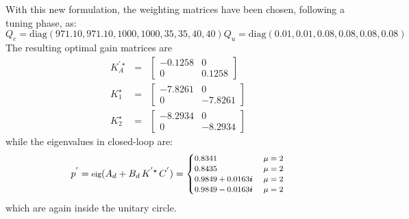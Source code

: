 \documentclass{ifacconf}
\begin{document}
With this new formulation, the weighting matrices have been chosen, 
following a tuning phase, as:
\begin{subequations}
    \begin{equation}
        Q_e = \text{diag}(971.10, 971.10, 1000, 1000, 35,35,40,40)
    \end{equation} 
    \begin{equation}
        Q_u = \text{diag}(0.01,0.01, 0.08, 0.08, 0.08, 0.08)
    \end{equation} 
\end{subequations}
The resulting optimal gain matrices are 
\begin{eqnarray}
    K^{'\star}_A &=& \begin{bmatrix}
        -0.1258 &  0  \\
         0 &  0.1258
    \end{bmatrix}\\
    K^{\star}_1 &=& \begin{bmatrix}
        -7.8261 & 0 \\
         0   & -7.8261
    \end{bmatrix}\\
    K^\star_2 &=& \begin{bmatrix}
        -8.2934  & 0 \\
         0   & -8.2934 
    \end{bmatrix}
\end{eqnarray}
while the eigenvalues in closed-loop are:
\begin{equation}
    \small
    p^{'} = \text{eig}(A_d + B_d \, K^{'\star} \, C^{'}) = 
    \begin{cases}
        0.8341 \ & \mu = 2\\
        0.8435 \ & \mu = 2\\
        0.9849 +  0.0163\boldsymbol{i} \  &   \mu = 2\\
        0.9849 -  0.0163\boldsymbol{i} \  &   \mu = 2
    \end{cases}
\end{equation}
which are again inside the unitary circle.
\end{document}
